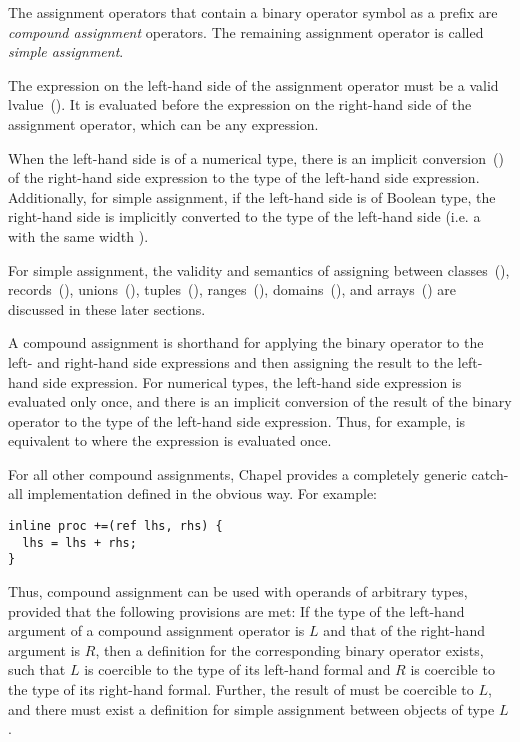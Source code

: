The assignment operators that contain a binary operator symbol as a prefix
are \emph{compound assignment} operators.  The remaining assignment
operator \chpl{=} is called \emph{simple assignment}.

The expression on the left-hand side of the assignment operator must
be a valid lvalue~().  It is evaluated before the
expression on the right-hand side of the assignment operator, which
can be any expression.

When the left-hand side is of a numerical type, there is
an implicit conversion~()
of the right-hand side expression
to the type of the left-hand side expression.  Additionally, for simple
assignment, if the left-hand side is of Boolean type, the right-hand side is
implicitly converted to the type of the left-hand side (i.e. a 
with the same width ).

For simple assignment, the validity and semantics of assigning between
classes~(), records~(),
unions~(), tuples~(),
ranges~(),
domains~(), and arrays~()
are discussed in these later sections.

A compound assignment is
shorthand for applying the binary operator to the left- and
right-hand side expressions and then assigning the result
to the left-hand side expression.
For numerical types, the left-hand side expression is evaluated only once,
and there is an implicit conversion of the result of the binary operator
to the type of the left-hand side expression.  Thus, for
example,  is equivalent to  where the
expression  is evaluated once.

For all other compound assignments, Chapel provides a completely generic
catch-all implementation defined in the obvious way.  For example:

\begin{chapel}
\begin{verbatim}
inline proc +=(ref lhs, rhs) {
  lhs = lhs + rhs;
}
\end{verbatim}
\end{chapel}

Thus, compound assignment can be used with operands of arbitrary types,
provided that the following provisions are met: If the type of the left-hand
argument of a compound assignment operator  is $L$ and that of the
right-hand argument is $R$, then a definition for the corresponding binary
operator  exists, such that $L$ is coercible to the type of its
left-hand formal and $R$ is coercible to the type of its right-hand formal.
Further, the result of  must be coercible to $L$, and there must exist
a definition for simple assignment between objects of type $L$.

